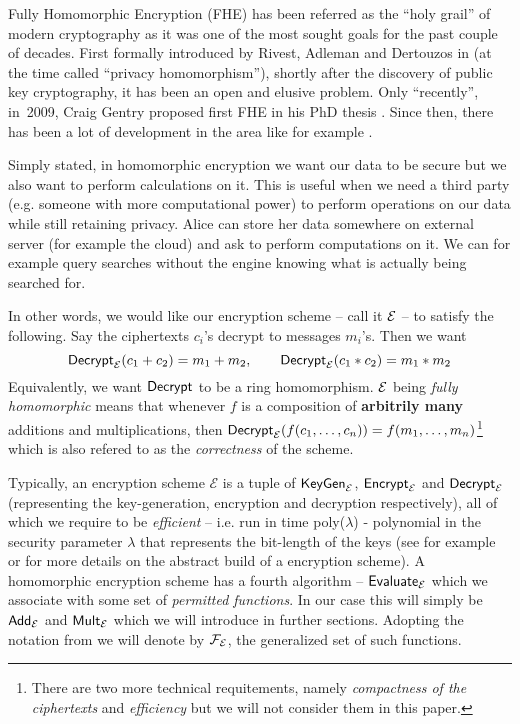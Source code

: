 Fully Homomorphic Encryption (FHE) has been referred as the ``holy grail'' of modern cryptography as it was one of the most sought goals for the past couple of decades. First formally introduced by Rivest, Adleman and Dertouzos in \cite{primal} (at the time called ``privacy homomorphism''), shortly after the discovery of public key cryptography, it has been an open and elusive problem. Only ``recently'', in~2009, Craig Gentry proposed first FHE in his PhD thesis \cite{gentry_phd}. Since then, there has been a lot of development in the area like for example .

Simply stated, in homomorphic encryption we want our data to be secure but we also want to perform calculations on it. This is useful when we need a third party (e.g. someone with more computational power) to perform operations on our data while still retaining privacy. Alice can store her data somewhere on external server (for example the cloud) and ask to perform computations on it. We can for example query searches without the engine knowing what is actually being searched for.

In other words, we would like our encryption scheme -- call it $\mathcal{E}$ -- to satisfy the following. Say the ciphertexts $c_i$'s decrypt to messages $m_i$'s. Then we want
\[ \textsf{Decrypt}_{\mathcal{E}}(c_1 + c_2) = m_1 + m_2, \qquad \textsf{Decrypt}_{\mathcal{E}}(c_1*c_2) = m_1*m_2 \]
Equivalently, we want $\textsf{Decrypt}$ to be a ring homomorphism. $\mathcal{E}$ being \textit{fully homomorphic} means that whenever $f$ is a composition of \textbf{arbitrily many} additions and multiplications, then $\textsf{Decrypt}_{\mathcal{E}}(f(c_1, \dots, c_n)) = f(m_1, \dots, m_n)$\footnote{There are two more technical requitements, namely \textit{compactness of the ciphertexts} and \textit{efficiency} but we will not consider them in this paper.} which is also refered to as the \textit{correctness} of the scheme.

\begin{remark} \label{algs}
    Typically, an encryption scheme $\mathcal{E}$ is a tuple of $\textsf{KeyGen}_{\mathcal{E}}$, $\textsf{Encrypt}_{\mathcal{E}}$ and $\textsf{Decrypt}_{\mathcal{E}}$ (representing the key-generation, encryption and decryption respectively), all of which we require to be \textit{efficient} -- i.e. run in time poly($\lambda$) - polynomial in the security parameter $\lambda$ that represents the bit-length of the keys (see for example \cite{katz} or \cite{book} for more details on the abstract build of a encryption scheme). A homomorphic encryption scheme has a fourth algorithm -- $\textsf{Evaluate}_{\mathcal{E}}$ which we associate with some set of \textit{permitted functions}. In our case this will simply be $\textsf{Add}_{\mathcal{E}}$ and $\textsf{Mult}_{\mathcal{E}}$ which we will introduce in further sections. Adopting the notation from \cite{easy_fhe} we will denote by $\mathcal{F}_{\mathcal{E}}$, the generalized set of such functions.
\end{remark}

